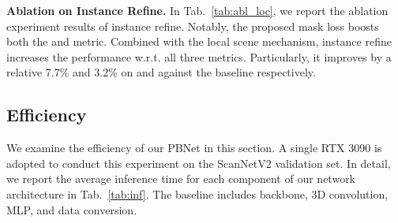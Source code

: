 \documentclass[10pt,twocolumn,letterpaper]{article}
\begin{document}
\noindent\textbf{Ablation on Instance Refine.} 
In Tab.~\ref{tab:abl_loc}, we report the ablation experiment results of instance refine. Notably, the proposed mask loss  boosts both the  and  metric. Combined with the local scene mechanism, instance refine increases the performance w.r.t. all three metrics. Particularly, it
improves by a relative 7.7\% and 3.2\% on  and  against the baseline respectively.
\begin{table}[h]
\centering
	\caption{Ablation Study on Instance Refine.}
\label{tab:abl_loc}
\end{table}



\subsection{Efficiency}
We examine the efficiency of our PBNet in this section. A single RTX 3090 is adopted to conduct this experiment on the ScanNetV2 validation set. In detail, we report the average inference time for each component of our network architecture in Tab.~\ref{tab:inf}. The baseline includes backbone, 3D convolution, MLP, and data conversion.
\end{document}
